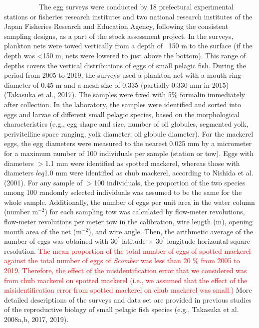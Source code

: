 \documentclass[12pt]{article}
\begin{document}
\begin{linenumbers}
{\ \ \ \ \ \ \ \ \ \ 
The egg surveys were conducted by 18 prefectural experimental stations or fisheries research institutes and two national research institutes of the Japan Fisheries Research and Education Agency, following the consistent sampling designs, as a part of the stock assessment project. In the surveys, plankton nets were towed vertically from a depth of ~150 m to the surface (if the depth was <150 m, nets were lowered to just above the bottom). This range of depths covers the vertical distributions of eggs of small pelagic fish. During the period from 2005 to 2019, the surveys used a plankton net with a mouth ring diameter of 0.45 m and a mesh size of 0.335 (partially 0.330 mm in 2015) (Takasuka et al., 2017). The samples were fixed with 5\% formalin immediately after collection. In the laboratory, the samples were identified and sorted into eggs and larvae of different small pelagic species, based on the morphological characteristics (e.g., egg shape and size, number of oil globules, segmented yolk, perivitelline space ranging, yolk diameter, oil globule diameter). For the mackerel eggs, the egg diameters were measured to the nearest 0.025 mm by a micrometer for a maximum number of 100 individuals per sample (station or tow). Eggs with diameters $>$1.1 mm were identified as spotted mackerel, whereas those with diameters $leq$1.0 mm were identified as chub mackerel, according to Nishida et al. (2001). For any sample of $>$100 individuals, the proportion of the two species among 100 randomly selected individuals was assumed to be the same for the whole sample. Additionally, the number of eggs per unit area in the water column (number $\mathrm{m^{-2}}$) for each sampling tow was calculated by flow-meter revolutions, flow-meter revolutions per meter tow in the calibration, wire length (m), opening mouth area of the net  ($\mathrm{m^{-2}}$), and wire angle. Then, the arithmetic average of the number of eggs was obtained with $\textrm{30}^\prime$ latitude $\times$ $\textrm{30}^\prime$ longitude horizontal square resolution. 
\textcolor{red}{The mean proportion of the total number of eggs of spotted mackerel against the total number of eggs of \textit{Scomber} was less than 20 \% from 2005 to 2019. Therefore, the effect of the misidentification error that we considered was from chub mackerel on spotted mackerel (i.e., we assumed that the effect of the misidentification error from spotted  mackerel on chub mackerel was small.)} More detailed descriptions of the surveys and data set are provided in previous studies of the reproductive biology of small pelagic fish species (e.g., Takasuka et al. 2008a,b, 2017, 2019).

}
\end{linenumbers}
\end{document}
